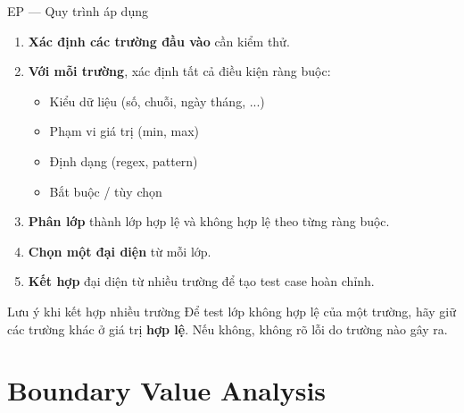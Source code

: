 \documentclass[aspectratio=169,12pt]{beamer}
\begin{document}
\begin{frame}{EP --- Quy trình áp dụng}
  \begin{enumerate}
    \item \textbf{Xác định các trường đầu vào} cần kiểm thử.

    \vspace{0.3em}
    \item \textbf{Với mỗi trường}, xác định tất cả điều kiện ràng buộc:
      \begin{itemize}
        \item Kiểu dữ liệu (số, chuỗi, ngày tháng, ...)
        \item Phạm vi giá trị (min, max)
        \item Định dạng (regex, pattern)
        \item Bắt buộc / tùy chọn
      \end{itemize}

    \vspace{0.3em}
    \item \textbf{Phân lớp} thành lớp hợp lệ và không hợp lệ theo từng ràng buộc.

    \vspace{0.3em}
    \item \textbf{Chọn một đại diện} từ mỗi lớp.

    \vspace{0.3em}
    \item \textbf{Kết hợp} đại diện từ nhiều trường để tạo test case hoàn chỉnh.
  \end{enumerate}

  \vspace{0.3em}
  \begin{alertblock}{Lưu ý khi kết hợp nhiều trường}
    Để test lớp không hợp lệ của một trường, hãy giữ các trường khác
    ở giá trị \textbf{hợp lệ}. Nếu không, không rõ lỗi do trường nào gây ra.
  \end{alertblock}
\end{frame}

\section{Boundary Value Analysis}
\end{document}
